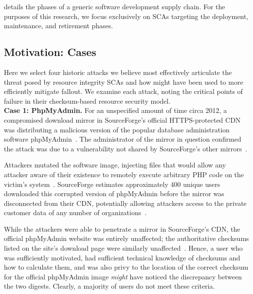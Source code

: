  details the phases of a generic software development supply
chain. For the purposes of this research, we focus exclusively on SCAs targeting
the deployment, maintenance, and retirement phases.

\subsection{Motivation: Cases}

Here we select four historic attacks we believe most effectively articulate the
threat posed by resource integrity SCAs and how \SYSTEM{} might have been used
to more efficiently mitigate fallout. We examine each attack, noting the
critical points of failure in their checksum-based resource security model. \\

\noindent\textbf{Case 1: PhpMyAdmin.} For an unspecified amount of time circa
2012, a compromised download mirror in SourceForge's official HTTPS-protected
CDN was distributing a malicious version of the popular database administration
software phpMyAdmin~\cite{SCA-PMA3}. The administrator of the mirror in question
confirmed the attack was due to a vulnerability not shared by SourceForge's
other mirrors~\cite{SCA-PMA2}.

Attackers mutated the software image, injecting files that would allow any
attacker aware of their existence to remotely execute arbitrary PHP code on the
victim's system~\cite{SCA-PMA1}. SourceForge estimates approximately 400 unique
users downloaded this corrupted version of phpMyAdmin before the mirror was
disconnected from their CDN, potentially allowing attackers access to the
private customer data of any number of organizations~\cite{SCA-PMA2}.

While the attackers were able to penetrate a mirror in SourceForge's CDN, the
official phpMyAdmin website was entirely unaffected; the authoritative checksums
listed on the site's download page were similarly unaffected~\cite{SCA-PMA2}.
Hence, a user who was sufficiently motivated, had sufficient technical knowledge
of checksums and how to calculate them, and was also privy to the location of
the correct checksum for the official phpMyAdmin image \emph{might} have
noticed the discrepancy between the two digests. Clearly, a majority of users do
not meet these criteria. \\

